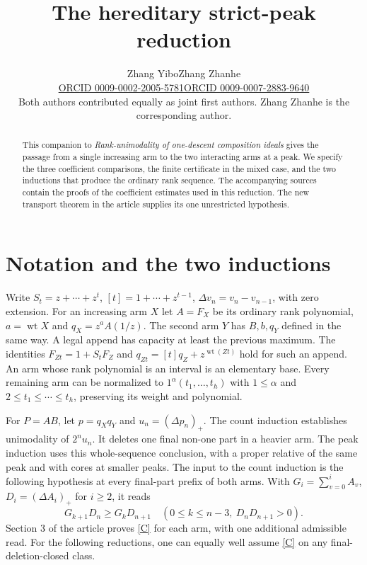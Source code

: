 \documentclass[11pt]{article}
\title{The hereditary strict-peak reduction}
\author{\begin{tabular}{@{}c@{\hspace{2em}}c@{}}
  \normalsize Zhang Yibo &
  \normalsize Zhang Zhanhe\\[-1pt]
  \footnotesize\href{https://orcid.org/0009-0002-2005-5781}{ORCID 0009-0002-2005-5781} &
  \footnotesize\href{https://orcid.org/0009-0007-2883-9640}{ORCID 0009-0007-2883-9640}
\end{tabular}\endgraf\vspace{3pt}%
{\footnotesize Both authors contributed equally as joint first authors. Zhang Zhanhe is the corresponding author.\endgraf}}
\date{}
\newcommand{\wt}{\operatorname{wt}}
\newcommand{\pos}[1]{(#1)_+}
\begin{document}
\maketitle
\begin{abstract}
This companion to \emph{Rank-unimodality of one-descent composition ideals}
gives the passage from a single increasing arm to the two interacting arms
at a peak. We specify the three coefficient comparisons, the finite
certificate in the mixed case, and the two inductions that produce the
ordinary rank sequence. The accompanying sources contain the proofs of
the coefficient estimates used in this reduction. The new transport
theorem in the article supplies its one unrestricted hypothesis.
\end{abstract}

\section{Notation and the two inductions}
Write \(S_t=z+\cdots+z^t\), \([t]=1+\cdots+z^{t-1}\),
\(\Delta v_n=v_n-v_{n-1}\), with zero extension. For an increasing arm
\(X\) let \(A=F_X\) be its ordinary rank polynomial, \(a=\wt X\) and
\(q_X=z^aA(1/z)\). The second arm \(Y\) has \(B,b,q_Y\) defined
in the same way. A legal append has capacity at least the previous maximum.
The identities \(F_{Zt}=1+S_tF_Z\) and \(q_{Zt}=[t]q_Z+z^{\wt(Zt)}\)
hold for such an append. An arm whose rank polynomial is an interval
is an elementary base. Every remaining arm can be normalized to
\(1^\alpha(t_1,\ldots,t_h)\) with \(1\le\alpha\) and
\(2\le t_1\le\cdots\le t_h\), preserving its weight and polynomial.

For \(P=AB\), let \(p=q_Xq_Y\) and \(u_n=\pos{\Delta p_n}\).
The count induction establishes unimodality of \(2^nu_n\). It deletes
one final non-one part in a heavier arm. The peak induction uses this
whole-sequence conclusion, with a proper relative of the same peak and
with cores at smaller peaks. The input to the count induction is the
following hypothesis at every final-part prefix of both arms. With
\(G_i=\sum_{v=0}^i A_v\), \(D_i=\pos{\Delta A_i}\) for \(i\ge2\),
it reads
\begin{equation}
 G_{k+1}D_n\ge G_kD_{n+1}
 \quad (0\le k\le n-3,\ D_nD_{n+1}>0).                    \label{C}
\end{equation}
Section 3 of the article proves \eqref{C} for each arm, with one
additional admissible read. For the following reductions, one can
equally well assume \eqref{C} on any final-deletion-closed class.
\end{document}
